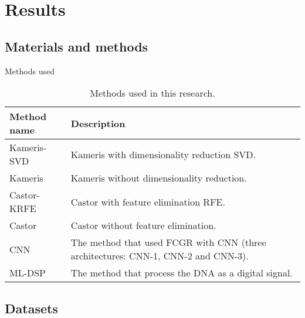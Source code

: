 \documentclass[10pt]{beamer}
\newcommand{\1}{
        	\setbeamertemplate{background}{
        		\texttt{[image: img/1]}
        		\tikz[overlay] \fill[fill opacity=0.75,fill=white] (0,0) rectangle (-\paperwidth,\paperheight);
        	}
}
\begin{document}
\section{Results}

\subsection{Materials and methods}

\begin{frame}{Methods used}
	\begin{table}	
		\caption{Methods used in this research.}
		\label{tab:methods}
		\begin{tabular}{lp{6.5cm}}
			\hline
			\textbf{Method name} & \textbf{Description} \\ \hline
			Kameris-SVD	& Kameris with dimensionality reduction SVD. \\
			Kameris	& Kameris without dimensionality reduction. \\
			Castor-KRFE & Castor with feature elimination RFE. \\
			Castor & Castor without feature elimination. \\
			CNN & The method that used FCGR with CNN (three architectures: CNN-1, CNN-2 and CNN-3). \\
			ML-DSP & The method that process the DNA as a digital signal. \\
			\hline
		\end{tabular}
		
		\label{tab:datasets}
	\end{table}

\end{frame}

\subsection{Datasets}
\end{document}
